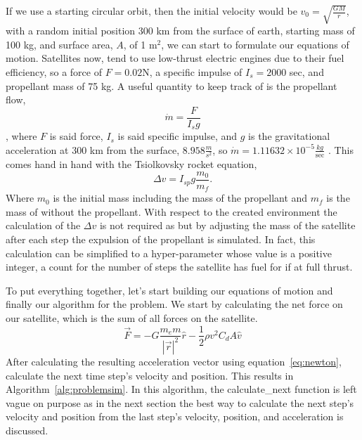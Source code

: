 If we use a starting circular orbit, then the initial velocity would be $v_0=\sqrt{\frac{GM}{r}}$, with a random initial position 300 km from the surface of earth, starting mass of 100 kg, and surface area, $A$, of 1 $\text{m}^2$, we can start to formulate our equations of motion. Satellites now, tend to use low-thrust electric engines due to their fuel efficiency, so a force of $F=0.02$N, a specific impulse of $I_s=2000$ sec, and propellant mass of 75 kg. A useful quantity to keep track of is the propellant flow, 
\begin{equation}
\dot{m}=\frac{F}{I_sg}
\end{equation}
, where $F$ is said force, $I_s$ is said specific impulse, and $g$ is the gravitational acceleration at 300 km from the surface, $8.958\frac{m}{s^2}$, so $\dot{m}=1.11632\times 10^{-5}\frac{kg}{\text{sec}}$ \cite{sutton_biblarz_2017}. This comes hand in hand with the Tsiolkovsky rocket equation, $$\Delta v=I_{sp}g\frac{m_0}{m_f}.$$ Where $m_0$ is the initial mass including the mass of the propellant and $m_f$ is the mass of without the propellant. With respect to the created environment the calculation of the $\Delta v$ is not required as but by adjusting the mass of the satellite after each step the expulsion of the propellant is simulated. In fact, this calculation can be simplified to a hyper-parameter whose value is a positive integer, a count for the number of steps the satellite has fuel for if at full thrust.

To put everything together, let's start building our equations of motion and finally our algorithm for the problem. We start by calculating the net force on our satellite, which is the sum of all forces on the satellite. 
\begin{equation}\label{eq:force}
\vec{F}=-G\frac{m_e m}{|\vec{r}|^2}\hat{r}-\frac{1}{2}\rho v^2 C_d A\hat{v}
\end{equation}
After calculating the resulting acceleration vector using equation~\ref{eq:newton}, calculate the next time step's velocity and position. This results in Algorithm~\ref{alg:problemsim}. In this algorithm, the calculate\_next function is left vague on purpose as in the next section the best way to calculate the next step's velocity and position from the last step's velocity, position, and acceleration is discussed.

